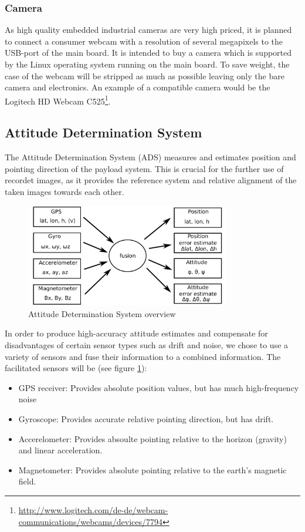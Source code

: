 \documentclass[fontsize=11pt,paper=a4,]{scrartcl}
\begin{document}
\subsubsection*{Camera}

As high quality embedded industrial cameras are very high priced, it is planned to connect a consumer webcam with a resolution of several megapixels to the USB-port of the main board. It is intended to buy a camera which is supported by the Linux operating system running on the main board. To save weight, the case of the webcam will be stripped as much as possible leaving only the bare camera and electronics. An example of a compatible camera would be the Logitech HD Webcam C525\footnote{\url{http://www.logitech.com/de-de/webcam-communications/webcams/devices/7794}}.


\FloatBarrier
\subsection{Attitude Determination System}
The Attitude Determination System (ADS) measures and estimates position and pointing direction of the payload system.
This is crucial for the further use of recordet images, as it provides the reference system and relative alignment of the taken images towards each other.
\begin{figure}
\centering
\includegraphics[width=0.8\textwidth]{figures/ADS_diagram.pdf}
\caption{Attitude Determination System overview}
\label{fig:ADS_overview}
\end{figure}

In order to produce high-accuracy attitude estimates and compensate for disadvantages of certain sensor types such as drift and noise, we chose to use a variety of sensors and fuse their information to a combined information.
The facilitated sensors will be (see figure \ref{fig:ADS_overview}):
\begin{itemize}
\item GPS receiver: Provides absolute position values, but has much high-frequency noise
\item Gyroscope: Provides accurate relative pointing direction, but has drift.
\item Accerelometer: Provides absoulte pointing relative to the horizon (gravity) and linear acceleration.
\item Magnetometer: Provides absolute pointing relative to the earth's magnetic field.
\end{itemize}
\end{document}
